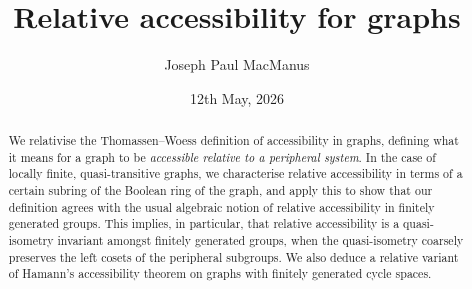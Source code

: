 \documentclass[11pt,a4paper]{amsart}
\title{Relative accessibility for graphs}
\author{Joseph Paul MacManus}
\date{12th May, 2026}
\DeclareMathOperator{\Aut}{Aut}
\theoremstyle{definition}
\newcommand{\per}{\mathcal{H}}
\begin{document}
\begin{abstract}
    We relativise the Thomassen--Woess definition of accessibility in graphs, defining what it means for a graph to be \emph{accessible relative to a peripheral system}. In the case of locally finite, quasi-transitive graphs, we characterise relative accessibility in terms of a certain subring of the Boolean ring of the graph, and apply this to show that our definition agrees with the usual algebraic notion of relative accessibility in finitely generated groups. This implies, in particular, that relative accessibility is a quasi-isometry invariant amongst finitely generated groups, when the quasi-isometry coarsely preserves the left cosets of the peripheral subgroups.
    We also deduce a relative variant of Hamann's accessibility theorem on graphs with finitely generated cycle spaces. 
    



\end{abstract}
\end{document}

